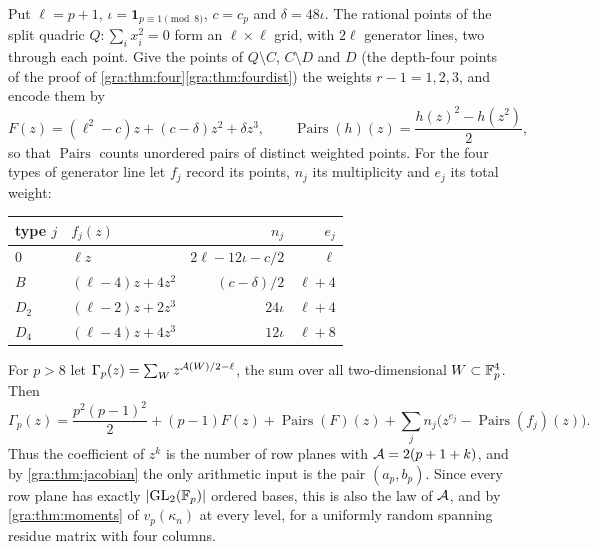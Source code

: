 Put $\ell=p+1$, $\iota=\mathbf 1_{p\equiv1\pmod8}$, $c=c_p$ and
$\delta=48\iota$. The rational points of the split quadric
$Q:\sum_ix_i^2=0$ form an $\ell\times\ell$ grid, with $2\ell$ generator
lines, two through each point. Give the points of $Q\setminus C$,
$C\setminus D$ and $D$ (the depth-four points of the proof of
\cref{gra:thm:four}\ref{gra:thm:fourdist}) the weights $r-1=1,2,3$, and encode them by
\[
 F(z)=(\ell^2-c)z+(c-\delta)z^2+\delta z^3,\qquad
 \operatorname{Pairs}(h)(z)=\frac{h(z)^2-h(z^2)}2 ,
\]
so that $\operatorname{Pairs}$ counts unordered pairs of distinct weighted
points. For the four types of generator line let $f_j$ record its points,
$n_j$ its multiplicity and $e_j$ its total weight:
\begin{center}\small\upshape
\begin{tabular}{llrr}
\toprule
type $j$ & $f_j(z)$ & $n_j$ & $e_j$\\
\midrule
$0$ & $\ell z$ & $2\ell-12\iota-c/2$ & $\ell$\\
$B$ & $(\ell-4)z+4z^2$ & $(c-\delta)/2$ & $\ell+4$\\
$D_2$ & $(\ell-2)z+2z^3$ & $24\iota$ & $\ell+4$\\
$D_4$ & $(\ell-4)z+4z^3$ & $12\iota$ & $\ell+8$\\
\bottomrule
\end{tabular}
\end{center}

\begin{theorem}\label{gra:thm:census}
For $p>8$ let $\Gamma_p(z)=\sum_Wz^{\mathcal{A}(W)/2-\ell}$, the sum over all
two-dimensional $W\subset\mathbb{F}_p^4$. Then
\[
 \Gamma_p(z)=\frac{p^2(p-1)^2}2+(p-1)F(z)+\operatorname{Pairs}(F)(z)
 +\sum_jn_j\bigl(z^{e_j}-\operatorname{Pairs}(f_j)(z)\bigr).
\]
Thus the coefficient of $z^k$ is the number of row planes with
$\mathcal{A}=2(p+1+k)$, and by \cref{gra:thm:jacobian} the only arithmetic input
is the pair $(a_p,b_p)$. Since every row plane has exactly
$\lvert\mathrm{GL}_2(\mathbb{F}_p)\rvert$ ordered bases, this is also the law of $\mathcal{A}$,
and by \cref{gra:thm:moments} of $v_p(\kappa_n)$ at every level, for a
uniformly random spanning residue matrix with four columns.
\end{theorem}

